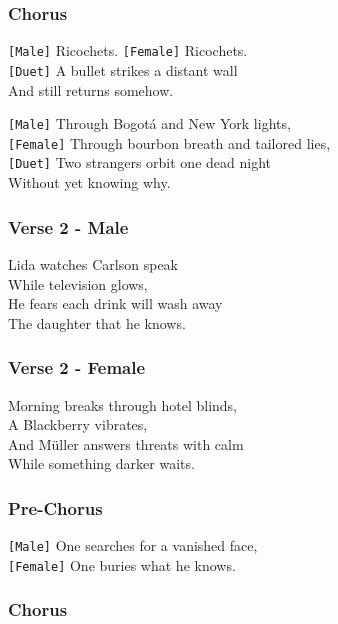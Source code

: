 \documentclass[]{article}
\begin{document}
\subsubsection{Chorus}\label{chorus-64}

\texttt{{[}Male{]}} Ricochets. \texttt{{[}Female{]}} Ricochets.\\
\texttt{{[}Duet{]}} A bullet strikes a distant wall\\
And still returns somehow.

\texttt{{[}Male{]}} Through Bogotá and New York lights,\\
\texttt{{[}Female{]}} Through bourbon breath and tailored lies,\\
\texttt{{[}Duet{]}} Two strangers orbit one dead night\\
Without yet knowing why.

\subsubsection{Verse 2 - Male}\label{verse-2---male}

Lida watches Carlson speak\\
While television glows,\\
He fears each drink will wash away\\
The daughter that he knows.

\subsubsection{Verse 2 - Female}\label{verse-2---female}

Morning breaks through hotel blinds,\\
A Blackberry vibrates,\\
And Müller answers threats with calm\\
While something darker waits.

\subsubsection{Pre-Chorus}\label{pre-chorus-37}

\texttt{{[}Male{]}} One searches for a vanished face,\\
\texttt{{[}Female{]}} One buries what he knows.

\subsubsection{Chorus}\label{chorus-65}
\end{document}
